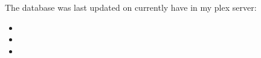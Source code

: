 The database was last updated on %
currently have in my plex server:
\begin{itemize}
  \item %

  \item %
    
  \item %
\end{itemize}
